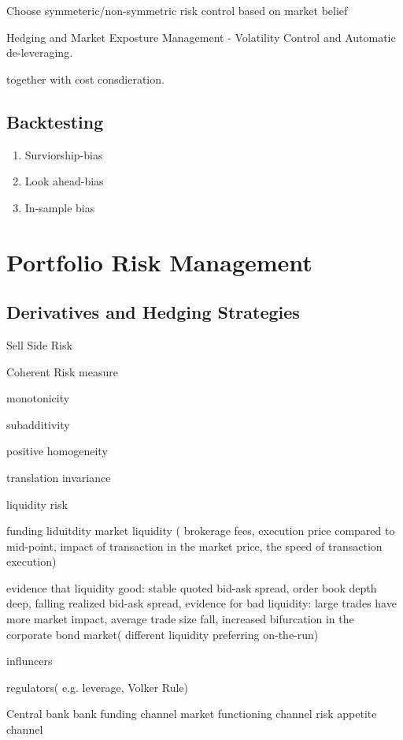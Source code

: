 \documentclass[11pt, openany]{book}              %
\begin{document}
Choose symmeteric/non-symmetric risk control based on market belief

Hedging and Market Exposture Management - Volatility Control and Automatic de-leveraging. 

together with cost consdieration. 

\section{Backtesting}

\begin{enumerate}
 \item Surviorship-bias
 \item Look ahead-bias
 \item In-sample bias
\end{enumerate}

\chapter{Portfolio Risk Management}

\section{Derivatives and Hedging Strategies}


Sell Side Risk

Coherent  Risk measure

monotonicity

subadditivity

positive homogeneity

translation invariance



liquidity risk


funding liduitdity
market liquidity ( brokerage fees, execution price compared to mid-point, impact of transaction in the market price, the speed of transaction execution)


evidence that liquidity good: stable quoted bid-ask spread, order book depth deep, falling realized bid-ask spread, 
evidence for bad liquidity: large trades have more market impact, average trade size fall, increased bifurcation in the corporate bond market( different liquidity preferring on-the-run)


influncers

regulators( e.g. leverage, Volker Rule)

Central bank
  bank funding channel
  market functioning channel
 risk appetite channel
\end{document}
